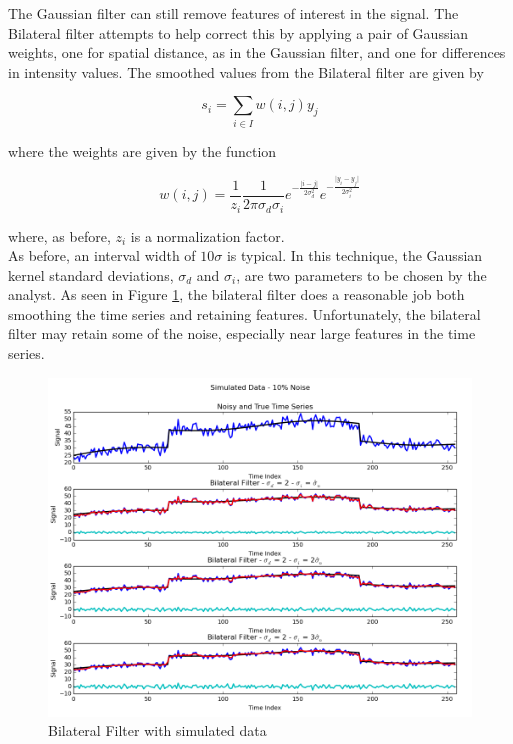 \documentclass[11pt]{article}
\theoremstyle{definition}
\begin{document}
The Gaussian filter can still remove features of interest in the signal. The Bilateral filter attempts to help correct this by applying a pair of Gaussian weights, one for spatial distance, as in the Gaussian filter, and one for differences in intensity values. The smoothed values from the Bilateral filter are given by

\begin{displaymath}
s_i = \sum _{i \in I} w \left(i, j \right) y_j
\end{displaymath}

\noindent
where the weights are given by the function

\begin{displaymath}
w\left(i, j\right) = \frac{1}{z_i} \frac{1}{2 \pi \sigma_d \sigma_i} e^{-\frac{\lvert i - j \rvert}{2 \sigma_d^2}}e^{-\frac{\lvert y_i - y_j \rvert}{2 \sigma_i^2}}
\end{displaymath}

\noindent
where, as before, $z_i$ is a normalization factor.\\

As before, an interval width of $10 \sigma$ is typical. In this technique, the Gaussian kernel standard deviations, $\sigma_d$ and $\sigma_i$, are two parameters to be chosen by the analyst. As seen in Figure \ref{bilateralcompare}, the bilateral filter does a reasonable job both smoothing the time series and retaining features. Unfortunately, the bilateral filter may retain some of the noise, especially near large features in the time series.\\

\begin{figure}
\centering
\includegraphics[width = 0.75 \textwidth]{BilateralCompare.png}
\caption{Bilateral Filter with simulated data}
\label{bilateralcompare}
\end{figure}
\end{document}
